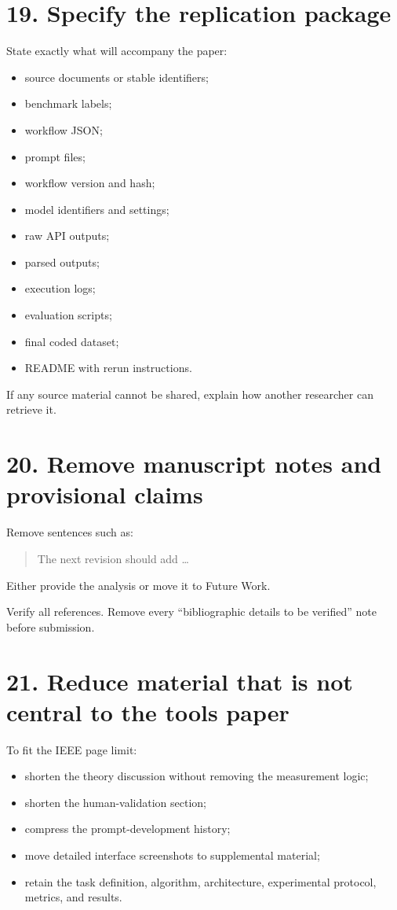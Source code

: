\documentclass[11pt]{article}
\begin{document}
\section*{19. Specify the replication package}

State exactly what will accompany the paper:

\begin{itemize}
    \item source documents or stable identifiers;
    \item benchmark labels;
    \item workflow JSON;
    \item prompt files;
    \item workflow version and hash;
    \item model identifiers and settings;
    \item raw API outputs;
    \item parsed outputs;
    \item execution logs;
    \item evaluation scripts;
    \item final coded dataset;
    \item README with rerun instructions.
\end{itemize}

If any source material cannot be shared, explain how another researcher can retrieve it.

\section*{20. Remove manuscript notes and provisional claims}

Remove sentences such as:

\begin{quote}
The next revision should add \ldots
\end{quote}

Either provide the analysis or move it to Future Work.

Verify all references. Remove every ``bibliographic details to be verified'' note before submission.

\section*{21. Reduce material that is not central to the tools paper}

To fit the IEEE page limit:

\begin{itemize}
    \item shorten the theory discussion without removing the measurement logic;
    \item shorten the human-validation section;
    \item compress the prompt-development history;
    \item move detailed interface screenshots to supplemental material;
    \item retain the task definition, algorithm, architecture, experimental protocol, metrics, and results.
\end{itemize}
\end{document}

